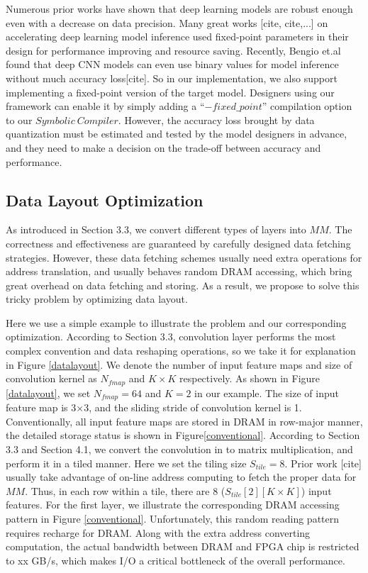 \documentclass{acm_proc_article-sp-copy}
\begin{document}
Numerous prior works have shown that deep learning models are robust enough even with a decrease on data precision. Many great works [cite, cite,...] on accelerating deep learning model inference used fixed-point parameters in their design for performance improving and resource saving. Recently, Bengio et.al found that deep CNN models can even use binary values for model inference without much accuracy loss[cite]. So in our implementation, we also support implementing a fixed-point version of the target model. Designers using our framework can enable it by simply adding a ``$-fixed\_point$'' compilation option to our $Symbolic\ Compiler$. However, the accuracy loss brought by data quantization must be estimated and tested by the model designers in advance, and they need to make a decision on the trade-off between accuracy and performance. 

\subsection{Data Layout Optimization}
As introduced in Section 3.3, we convert different types of layers into $MM$. The correctness and effectiveness are guaranteed by carefully designed data fetching strategies. However, these data fetching schemes usually need extra operations for address translation, and usually behaves random DRAM accessing, which bring great overhead on data fetching and storing. As a result, we propose to solve this tricky problem by optimizing data layout.

Here we use a simple example to illustrate the problem and our corresponding optimization. According to Section 3.3, convolution layer performs the most complex convention and data reshaping operations, so we take it for explanation in Figure \ref{datalayout}. We denote the number of input feature maps and size of convolution kernel as $N_{fmap}$ and $K\times K$ respectively. As shown in Figure \ref{datalayout}, we set $N_{fmap}=64$ and $K=2$ in our example. The size of input feature map is 3$\times$3, and the sliding stride of convolution kernel is 1. Conventionally, all input feature maps are stored in DRAM in row-major manner, the detailed storage status is shown in Figure\ref{conventional}. According to Section 3.3 and Section 4.1, we convert the convolution in to matrix multiplication, and perform it in a tiled manner. Here we set the tiling size $S_{tile}=8$. Prior work [cite] usually take advantage of on-line address computing to fetch the proper data for $MM$. Thus, in each row within a tile, there are 8 ($S_{tile}[2][K\times K]$) input features. For the first layer, we illustrate the corresponding DRAM accessing pattern in Figure \ref{conventional}. Unfortunately, this random reading pattern requires recharge for DRAM. Along with the extra address converting computation, the actual bandwidth between DRAM and FPGA chip is restricted to xx GB/s, which makes I/O a critical bottleneck of the overall performance.
\end{document}
